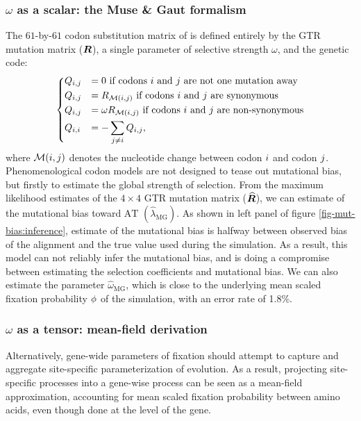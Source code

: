 \subsubsection{$\omega$ as a scalar: the Muse \& Gaut formalism}

The $61$-by-$61$ \gls{codon} \gls{substitution} matrix of \citet{Muse1994} is defined entirely by the GTR mutation matrix ($\bm{R}$), a single parameter of selective strength $\omega$, and the genetic code:
\begin{equation}
    \begin{dcases}
        Q_{{i}, {j}} & = 0 \text{ if codons ${i}$ and ${j}$ are not one mutation away} \\
        Q_{{i}, {j}} & = R_{\mathcal{M}({i}, {j})} \text{ if codons ${i}$ and ${j}$ are synonymous} \\
        Q_{{i}, {j}} & = \omega R_{\mathcal{M}({i}, {j})} \text{ if codons ${i}$ and ${j}$ are non-synonymous} \\
        Q_{{i}, {i}} & = - \sum\limits_{{j} \neq {i}} Q_{{i}, {j}},
    \end{dcases}
    \label{eq:codon-muse-gaut}
\end{equation}
where $\mathcal{M}({i}, {j})$ denotes the nucleotide change between codon ${i}$ and codon ${j}$.
Phenomenological \gls{codon} models are not designed to tease out mutational bias, but firstly to estimate the global strength of selection.
From the maximum \gls{likelihood} estimates of the $4 \times 4$ GTR mutation matrix ($\widehat{\bm{R}}$), we can estimate of the mutational bias toward $\mathrm{AT}$ $\left({\widehat{\lambda}_{\text{MG}}} \right)$.
As shown in left panel of figure \ref{fig-mut-bias:inference}, estimate of the mutational bias is halfway between observed bias of the alignment and the true value used during the simulation.
As a result, this model can not reliably infer the mutational bias, and is doing a compromise between estimating the selection coefficients and mutational bias.
We can also estimate the parameter ${\widehat{\omega}_{\text{MG}}}$, which is close to the underlying mean scaled fixation probability $\phi$ of the simulation, with an error rate of 1.8\%.

\subsubsection{$\omega$ as a tensor: mean-field derivation}

Alternatively, gene-wide parameters of fixation should attempt to capture and aggregate site-specific parameterization of evolution.
As a result, projecting site-specific processes into a gene-wise process can be seen as a mean-field approximation, accounting for mean scaled fixation probability between amino acids, even though done at the level of the gene.

